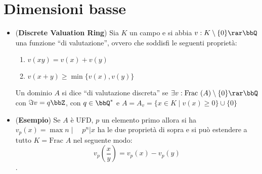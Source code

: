 \documentclass[a4paper,NoNotes,GeneralMath]{stdmdoc}
\newcommand{\Frac}{\text{Frac }}
\begin{document}
\section*{Dimensioni basse}
\begin{itemize}
\item ({\bf Discrete Valuation Ring}) Sia $K$ un campo e si abbia
  $v: K \setminus \{ 0 \} \rar \bbQ$ una funzione ``di valutazione'',
  ovvero che soddisfi le seguenti proprietà:
  \begin{enumerate}
  \item $v(xy) = v(x) + v(y)$
  \item $v(x + y) \ge \min \{ v(x), v(y) \}$
  \end{enumerate}

  Un dominio $A$ si dice ``di valutazione discreta'' se $\exists v:
  \Frac(A) \setminus \{ 0 \} \rar \bbQ$ con $\Im v = q \bbZ$, con $q \in
  \bbQ^*$ e $A = A_v = \{ x \in K \mid v(x) \ge 0 \} \cup \{ 0 \}$
\item ({\bf Esempio}) Se $A$ è UFD, $p$ un elemento primo allora si ha
  $v_p (x) = \max {n \mid \quad p^n | x }$ ha le due proprietà di sopra
  e si può estendere a tutto $K = \Frac A$ nel seguente modo:
  $$ v_p (\frac{x}{y}) = v_p(x) - v_p(y) $$.


\end{itemize}
\end{document}
